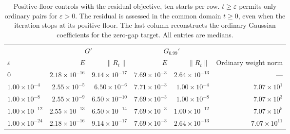 \begin{table}[htbp]\centering\footnotesize
\caption{Positive-floor controls with the residual objective, ten starts per row. $t\ge\varepsilon$ permits only ordinary pairs for $\varepsilon>0$. The residual is assessed in the common domain $t\ge0$, even when the iteration stops at its positive floor. The last column reconstructs the ordinary Gaussian coefficients for the zero-gap target. All entries are medians.}
\label{tab:positive-floor-controls}
\begin{tabular}{@{}lrrrrr@{}}\toprule
 & \multicolumn{2}{c}{$G'$} & \multicolumn{2}{c}{$G_{0.99}'$} & \\
$\varepsilon$ & $E$ & $\|R_t\|$ & $E$ & $\|R_t\|$ & Ordinary weight norm\\\midrule
$0$ & $2.18\times10^{-16}$ & $9.14\times10^{-17}$ & $7.69\times10^{-3}$ & $2.64\times10^{-13}$ & ---\\
$1.00\times10^{-4}$ & $2.55\times10^{-5}$ & $6.50\times10^{-6}$ & $7.71\times10^{-3}$ & $1.00\times10^{-4}$ & $7.07\times10^{1}$\\
$1.00\times10^{-8}$ & $2.55\times10^{-9}$ & $6.50\times10^{-10}$ & $7.69\times10^{-3}$ & $1.00\times10^{-8}$ & $7.07\times10^{3}$\\
$1.00\times10^{-12}$ & $2.55\times10^{-13}$ & $6.50\times10^{-14}$ & $7.69\times10^{-3}$ & $1.00\times10^{-12}$ & $7.07\times10^{5}$\\
$1.00\times10^{-24}$ & $2.18\times10^{-16}$ & $9.14\times10^{-17}$ & $7.69\times10^{-3}$ & $2.64\times10^{-13}$ & $7.07\times10^{11}$\\
\bottomrule\end{tabular}
\end{table}
